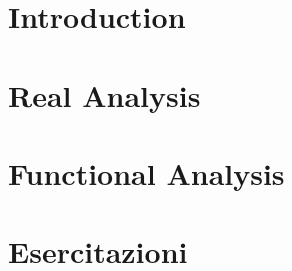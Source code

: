 \documentclass[10pt,a4paper,twoside]{book}
\numberwithin{figure}{section}
\numberwithin{equation}{section}
\begin{document}

\pagestyle{fancy}
\mainmatter

\part{Introduction}
 \cleardoublepage
 \cleardoublepage

\part{Real Analysis}
 \cleardoublepage
 \cleardoublepage
 \cleardoublepage
 \cleardoublepage
 \cleardoublepage
 \cleardoublepage
 \cleardoublepage
 \cleardoublepage
 \cleardoublepage

\part{Functional Analysis}
 \cleardoublepage
 \cleardoublepage
 \cleardoublepage
 \cleardoublepage
 \cleardoublepage
 \cleardoublepage
 \cleardoublepage
 \cleardoublepage

\part{Esercitazioni}
 \cleardoublepage
 \cleardoublepage
 \cleardoublepage
 \cleardoublepage
 \cleardoublepage
 \cleardoublepage
 \cleardoublepage
 \cleardoublepage
 \cleardoublepage
 \cleardoublepage
\end{document}

